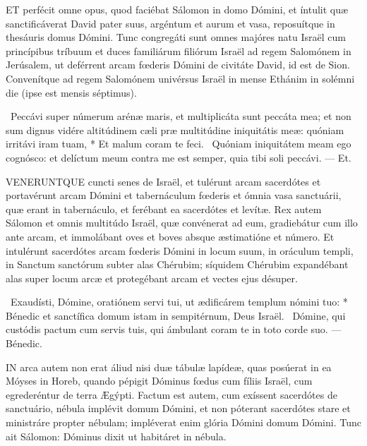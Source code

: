 


\lettrine[lines=2]{E}{T} perfécit omne opus, quod faciébat Sálomon in domo Dómini, et íntulit quæ sanctificáverat David pater suus, argéntum et aurum et vasa, reposuítque in thesáuris domus Dómini. Tunc congregáti sunt omnes majóres natu Israël cum princípibus tríbuum et duces familiárum filiórum Israël ad regem Salomónem in Jerúsalem, ut deférrent arcam fœderis Dómini de civitáte David, id est de Sion. Convenítque ad regem Salomónem univérsus Israël in mense Ethánim in solémni die (ipse est mensis séptimus).

\R\ Peccávi super númerum arénæ maris, et multiplicáta sunt peccáta mea; et non sum dignus vidére altitúdinem cæli præ multitúdine iniquitátis meæ: quóniam irritávi iram tuam, * Et malum coram te feci. \V\ Quóniam iniquitátem meam ego cognósco: et delíctum meum contra me est semper, quia tibi soli peccávi. --- Et.


\lettrine[lines=2]{V}{ENERUNTQUE} cuncti senes de Israël, et tulérunt arcam sacerdótes et portavérunt arcam Dómini et tabernáculum fœderis et ómnia vasa sanctuárii, quæ erant in tabernáculo, et ferébant ea sacerdótes et levítæ. Rex autem Sálomon et omnis multitúdo Israël, quæ convénerat ad eum, gradiebátur cum illo ante arcam, et immolábant oves et boves absque æstimatióne et número. Et intulérunt sacerdótes arcam fœderis Dómini in locum suum, in oráculum templi, in Sanctum sanctórum subter alas Chérubim; síquidem Chérubim expandébant alas super locum arcæ et protegébant arcam et vectes ejus désuper.

\R\ Exaudísti, Dómine, oratiónem servi tui, ut ædificárem templum nómini tuo: * Bénedic et sanctífica domum istam in sempitérnum, Deus Israël. \V\ Dómine, qui custódis pactum cum servis tuis, qui ámbulant coram te in toto corde suo. --- Bénedic.



\lettrine[lines=2]{I}{N} arca autem non erat áliud nisi duæ tábulæ lapídeæ, quas posúerat in ea Móyses in Horeb, quando pépigit Dóminus fœdus cum fíliis Israël, cum egrederéntur de terra Ægýpti. Factum est autem, cum exíssent sacerdótes de sanctuário, nébula implévit domum Dómini, et non póterant sacerdótes stare et ministráre propter nébulam; impléverat enim glória Dómini domum Dómini. Tunc ait Sálomon: Dóminus dixit ut habitáret in nébula.

